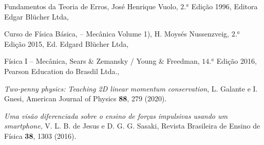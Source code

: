 
\vspace{-0.7cm}

\begin{thebibliography}{9}
 Fundamentos da Teoria de Erros,  José Henrique Vuolo,  $2.^a$ Edição 1996, Editora Edgar Blücher Ltda,

 Curso de Física Básica,  – Mecânica Volume 1), H. Moysés Nussenzveig, $2.^a$ Edição 2015, Ed. Edgard Blücher Ltda,

 Física I – Mecânica, Sears \& Zemansky / Young \& Freedman, $14.^a$ Edição 2016, Pearson Education do Brasdil Ltda., 

{\it Two-penny physics: Teaching 2D linear momentum conservation}, 
L. Galante e I. Gnesi, 
American Journal of Physics {\bf88}, 279  (2020).

{\it Uma visão diferenciada sobre o ensino de forças impulsivas
usando um smartphone}, 
V. L. B. de Jesus e D. G. G. Sasaki, 
Revista Brasileira de Ensino de Física {\bf38}, 1303  (2016).
\end{thebibliography}


